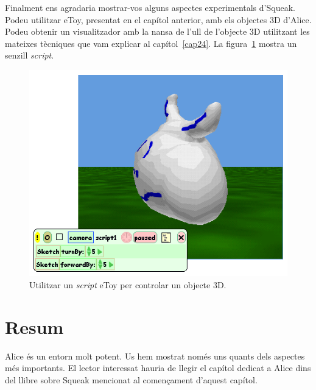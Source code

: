 Finalment ens agradaria mostrar-vos alguns aspectes experimentals d'Squeak. Podeu utilitzar eToy, presentat en el capítol anterior, amb els objectes 3D d'Alice. Podeu obtenir un visualitzador amb la nansa de l'ull de l'objecte 3D utilitzant les mateixes tècniques que vam explicar al capítol~\ref{cap24}. La figura~\ref{fig2517} mostra un senzill \emph{script}.
\begin{figure}[h!]
\begin{center}
\includegraphics[scale=0.5]{Imatges/figura25-17}
\end{center}
\caption{Utilitzar un \emph{script} eToy per controlar un objecte 3D.}
\label{fig2517}
\end{figure}

\section{Resum}

Alice és un entorn molt potent. Us hem mostrat només uns quants dels aspectes més importants. El lector interessat hauria de llegir el capítol dedicat a Alice dins del llibre sobre Squeak mencionat al començament d'aquest capítol.


